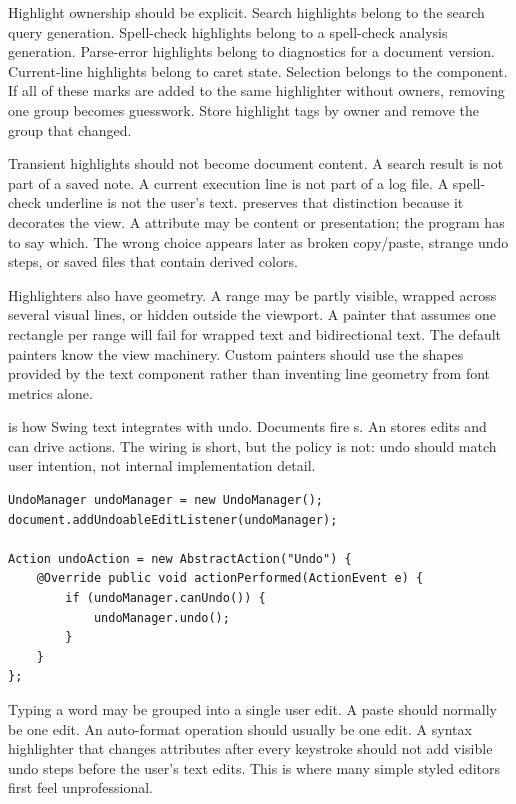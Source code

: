 Highlight ownership should be explicit. Search highlights belong to the search
query generation. Spell-check highlights belong to a spell-check analysis
generation. Parse-error highlights belong to diagnostics for a document
version. Current-line highlights belong to caret state. Selection belongs to
the component. If all of these marks are added to the same highlighter without
owners, removing one group becomes guesswork. Store highlight tags by owner and
remove the group that changed.

Transient highlights should not become document content. A search result is
not part of a saved note. A current execution line is not part of a log file.
A spell-check underline is not the user's text.  preserves
that distinction because it decorates the view. A 
attribute may be content or presentation; the program has to say which. The
wrong choice appears later as broken copy/paste, strange undo steps, or saved
files that contain derived colors.

Highlighters also have geometry. A range may be partly visible, wrapped across
several visual lines, or hidden outside the viewport. A painter that assumes
one rectangle per range will fail for wrapped text and bidirectional text. The
default painters know the view machinery. Custom painters should use the
shapes provided by the text component rather than inventing line geometry from
font metrics alone.

 is how Swing text integrates with undo. Documents fire s. An  stores edits and can drive actions. The wiring is short, but the policy is not: undo should match user intention, not internal implementation detail.

\begin{lstlisting}[caption={Basic document undo wiring.}]
UndoManager undoManager = new UndoManager();
document.addUndoableEditListener(undoManager);

Action undoAction = new AbstractAction("Undo") {
    @Override public void actionPerformed(ActionEvent e) {
        if (undoManager.canUndo()) {
            undoManager.undo();
        }
    }
};
\end{lstlisting}

Typing a word may be grouped into a single user edit. A paste should normally be one edit. An auto-format operation should usually be one edit. A syntax highlighter that changes attributes after every keystroke should not add visible undo steps before the user's text edits. This is where many simple styled editors first feel unprofessional.

